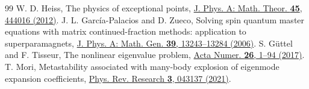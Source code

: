 \documentclass[aps,pra,10pt,onecolumn,superscriptaddress,amsmath,amssymb]{revtex4-2}
\begin{document}
\begin{thebibliography}{99}
 W. D. Heiss, The physics of exceptional points, \href{https://doi.org/10.1088/1751-8113/45/44/444016}{J. Phys. A: Math. Theor. \textbf{45}, 444016 (2012)}.
 J. L. Garc\'ia-Palacios and D. Zueco, Solving spin quantum master equations with matrix continued-fraction methods: application to superparamagnets, \href{https://doi.org/10.1088/0305-4470/39/42/005}{J. Phys. A: Math. Gen. \textbf{39}, 13243--13284 (2006)}.
 S. G\"uttel and F. Tisseur, The nonlinear eigenvalue problem, \href{https://doi.org/10.1017/S0962492917000034}{Acta Numer. \textbf{26}, 1--94 (2017)}.
 T. Mori, Metastability associated with many-body explosion of eigenmode expansion coefficients, \href{https://doi.org/10.1103/PhysRevResearch.3.043137}{Phys. Rev. Research \textbf{3}, 043137 (2021)}.
\end{thebibliography}
\end{document}
